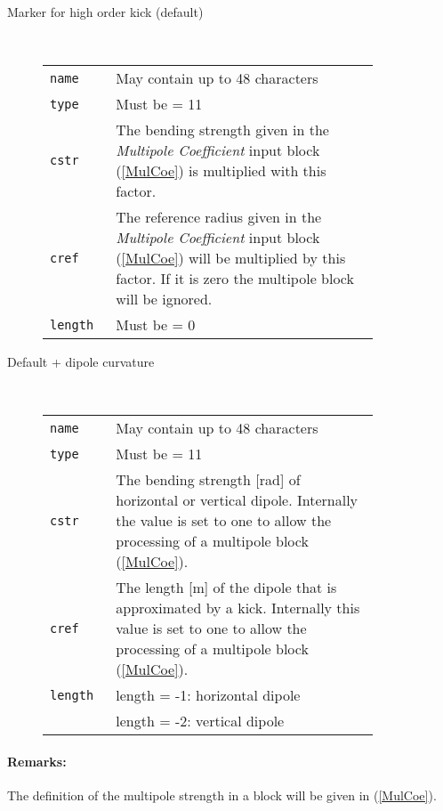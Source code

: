 \begin{description}
    \item [Marker for high order kick (default)]~\\
    
    \bigskip
    \begin{tabular}{@{}lp{0.8\linewidth}}
        \texttt{name} & May contain up to 48 characters \\
        \texttt{type} & Must be = 11 \\
        \texttt{cstr} & The bending strength given in the \textit{Multipole Coefficient} input block (\ref{MulCoe}) is multiplied with this factor.\\
        \texttt{cref} & The reference radius given in the \textit{Multipole Coefficient} input block (\ref{MulCoe}) will be multiplied by this factor. If it is zero the multipole block will be ignored.\\
        \texttt{length} & Must be = 0
    \end{tabular}
    \item [Default + dipole curvature]~\\
    
    \bigskip
    \begin{tabular}{@{}lp{0.8\linewidth}}
        \texttt{name} & May contain up to 48 characters \\
        \texttt{type} & Must be = 11 \\
        \texttt{cstr} & The bending strength [rad] of horizontal or vertical dipole. Internally the value is set to one to allow the processing of a multipole block (\ref{MulCoe}).\\
        \texttt{cref} & The length [m] of the dipole that is approximated by a kick. Internally this value is set to one to allow the processing of a multipole block (\ref{MulCoe}). \\
        \texttt{length} & length = -1: horizontal dipole \\
                        & length = -2: vertical dipole
    \end{tabular}
\end{description}

\paragraph{Remarks:}
The definition of the multipole strength in a block will be given in (\ref{MulCoe}).

